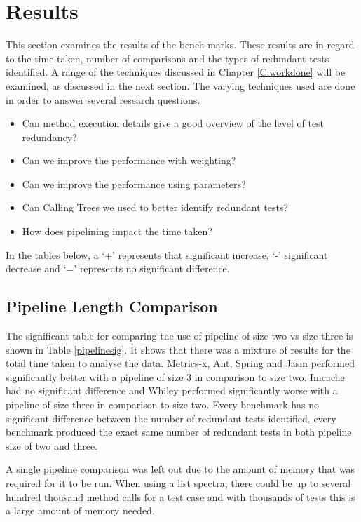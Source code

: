 \chapter{Results}\label{C:results}

This section examines the results of the bench marks. These results are in regard to the time taken, number of comparisons and the types of redundant tests identified. A range of the techniques discussed in Chapter \ref{C:workdone} will be examined, as discussed in the next section. The varying techniques used are done in order to answer several research questions.

\begin{itemize}
\item{Can method execution details give a good overview of the level of test redundancy?}
\item{Can we improve the performance with weighting?}
\item{Can we improve the performance using parameters?}
\item{Can Calling Trees we used to better identify redundant tests?}
\item{How does pipelining impact the time taken?}
\end{itemize}

In the tables below, a `+' represents that significant increase, `-' significant decrease and `=' represents no significant difference.

\section{Pipeline Length Comparison}

The significant table for comparing the use of pipeline of size two vs size three is shown in Table \ref{pipelinesig}. It shows that there was a mixture of results for the total time taken to analyse the data. Metrics-x, Ant, Spring and Jasm performed significantly better with a pipeline of size 3 in comparison to size two. Imcache had no significant difference and Whiley performed significantly worse with a pipeline of size three in comparison to size two. Every benchmark has no significant difference between the number of redundant tests identified, every benchmark produced the exact same number of redundant tests in both pipeline size of two and three.

A single pipeline comparison was left out due to the amount of memory that was required for it to be run. When using a list spectra, there could be up to several hundred thousand method calls for a test case and with thousands of tests this is a large amount of memory needed.

